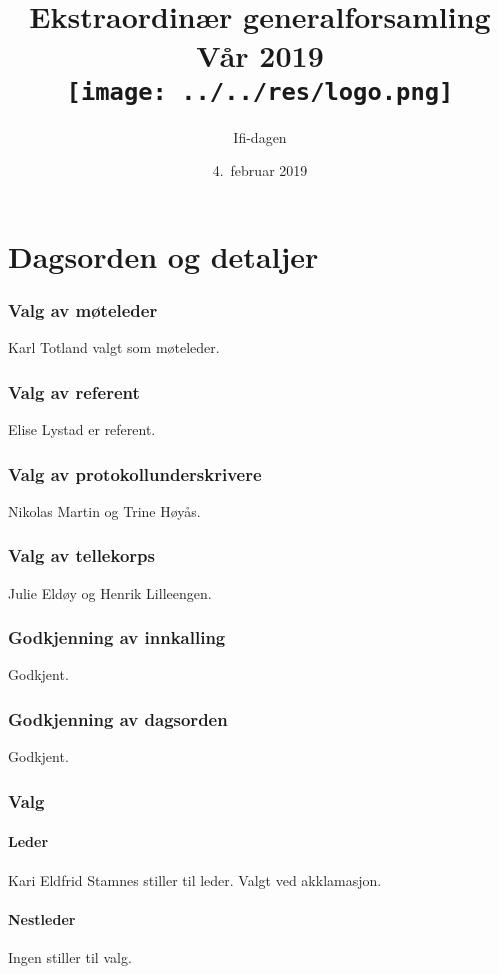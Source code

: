 \documentclass[10pt,norsk,a4paper]{article}
\title{Ekstraordinær generalforsamling \\
	Vår 2019\\[3cm]
	\texttt{[image: ../../res/logo.png]}\\}
\date{4.\ februar 2019}
\author{Ifi-dagen}
\begin{document}
\maketitle{}
\newpage
\part{Dagsorden og detaljer}
\tableofcontents{}
\newpage


\section{Valg av møteleder}
Karl Totland valgt som møteleder.

\section{Valg av referent}
Elise Lystad er referent. 

\section{Valg av protokollunderskrivere}
Nikolas Martin og Trine Høyås.

\section{Valg av tellekorps}
Julie Eldøy og Henrik Lilleengen.

\section{Godkjenning av innkalling}
Godkjent. 

\section{Godkjenning av dagsorden}
Godkjent.

\section{Valg}

\subsection{Leder}
Kari Eldfrid Stamnes stiller til leder. 
Valgt ved akklamasjon.

\subsection{Nestleder}
Ingen stiller til valg. 
\end{document}
